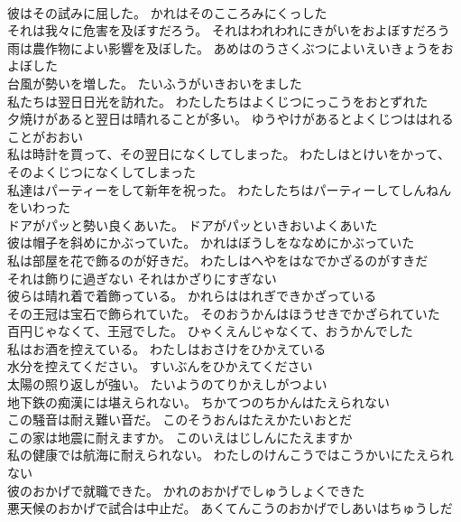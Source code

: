 \documentclass[8pt]{extreport}
\begin{document}
\begin{CJK}{UTF8}{min}
\\	彼はその試みに屈した。	かれはそのこころみにくっした 
\\	それは我々に危害を及ぼすだろう。	それはわれわれにきがいをおよぼすだろう 
\\	雨は農作物によい影響を及ぼした。	あめはのうさくぶつによいえいきょうをおよぼした 
\\	台風が勢いを増した。	たいふうがいきおいをました 
\\	私たちは翌日日光を訪れた。	わたしたちはよくじつにっこうをおとずれた 
\\	夕焼けがあると翌日は晴れることが多い。	ゆうやけがあるとよくじつははれることがおおい 
\\	私は時計を買って、その翌日になくしてしまった。	わたしはとけいをかって、そのよくじつになくしてしまった 
\\	私達はパーティーをして新年を祝った。	わたしたちはパーティーしてしんねんをいわった 
\\	ドアがパッと勢い良くあいた。	ドアがパッといきおいよくあいた 
\\	彼は帽子を斜めにかぶっていた。	かれはぼうしをななめにかぶっていた 
\\	私は部屋を花で飾るのが好きだ。	わたしはへやをはなでかざるのがすきだ 
\\	それは飾りに過ぎない	それはかざりにすぎない 
\\	彼らは晴れ着で着飾っている。	かれらははれぎできかざっている 
\\	その王冠は宝石で飾られていた。	そのおうかんはほうせきでかざられていた 
\\	百円じゃなくて、王冠でした。	ひゃくえんじゃなくて、おうかんでした 
\\	私はお酒を控えている。	わたしはおさけをひかえている 
\\	水分を控えてください。	すいぶんをひかえてください 
\\	太陽の照り返しが強い。	たいようのてりかえしがつよい 
\\	地下鉄の痴漢には堪えられない。	ちかてつのちかんはたえられない 
\\	この騒音は耐え難い音だ。	このそうおんはたえかたいおとだ 
\\	この家は地震に耐えますか。	このいえはじしんにたえますか 
\\	私の健康では航海に耐えられない。	わたしのけんこうではこうかいにたえられない 
\\	彼のおかげで就職できた。	かれのおかげでしゅうしょくできた 
\\	悪天候のおかげで試合は中止だ。	あくてんこうのおかげでしあいはちゅうしだ 

\end{CJK}
\end{document}
